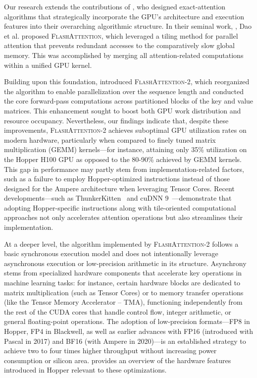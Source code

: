Our research extends the contributions of \citet{dao2022flashattention}, who designed exact-attention algorithms that strategically incorporate the GPU’s architecture and execution features into their overarching algorithmic structure. In their seminal work, \citep{dao2022flashattention}, Dao et al. proposed \textsc{FlashAttention}, which leveraged a tiling method for parallel attention that prevents redundant accesses to the comparatively slow global memory. This was accomplished by merging all attention-related computations within a unified GPU kernel.

Building upon this foundation, \citet{dao2023flashattention2} introduced \textsc{FlashAttention-2}, which reorganized the algorithm to enable parallelization over the sequence length and conducted the core forward-pass computations across partitioned blocks of the key and value matrices. This enhancement sought to boost both GPU work distribution and resource occupancy. Nevertheless, our findings indicate that, despite these improvements, \textsc{FlashAttention-2} achieves suboptimal GPU utilization rates on modern hardware, particularly when compared to finely tuned matrix multiplication (GEMM) kernels—for instance, attaining only 35\% utilization on the Hopper H100 GPU as opposed to the 80-90\% achieved by GEMM kernels. This gap in performance may partly stem from implementation-related factors, such as a failure to employ Hopper-optimized instructions instead of those designed for the Ampere architecture when leveraging Tensor Cores. Recent developments—such as ThunkerKitten~\citep{spector2024thunder} and cuDNN 9~\citep{cudnn9}—demonstrate that adopting Hopper-specific instructions along with tile-oriented computational approaches not only accelerates attention operations but also streamlines their implementation.

At a deeper level, the algorithm implemented by \textsc{FlashAttention-2} follows a basic synchronous execution model and does not intentionally leverage asynchronous execution or low-precision arithmetic in its structure. Asynchrony stems from specialized hardware components that accelerate key operations in machine learning tasks: for instance, certain hardware blocks are dedicated to matrix multiplication (such as Tensor Cores) or to memory transfer operations (like the Tensor Memory Accelerator -- TMA), functioning independently from the rest of the CUDA cores that handle control flow, integer arithmetic, or general floating-point operations. The adoption of low-precision formats—FP8 in Hopper, FP4 in Blackwell, as well as earlier advances with FP16 (introduced with Pascal in 2017) and BF16 (with Ampere in 2020)—is an established strategy to achieve two to four times higher throughput without increasing power consumption or silicon area.  provides an overview of the hardware features introduced in Hopper relevant to these optimizations.

